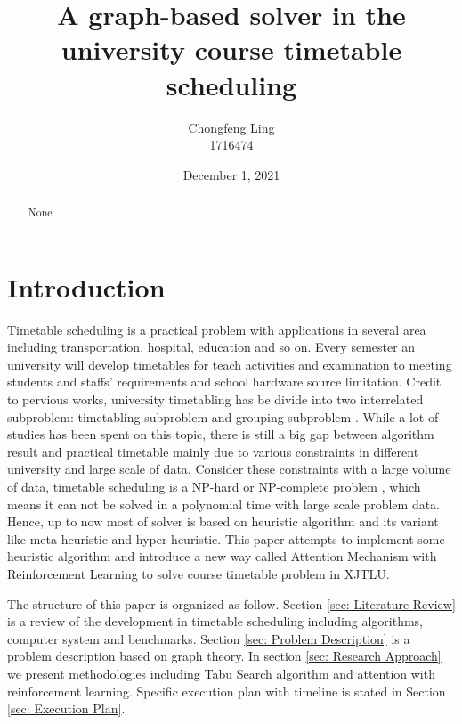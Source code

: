\documentclass{article}
\title{A graph-based solver in the university course timetable scheduling\text}
\author{Chongfeng Ling\\1716474}
\date{December 1, 2021}
\begin{document}
\maketitle

\begin{abstract}
	\begin{center}
		None
	\end{center}
\end{abstract}


\newpage
\tableofcontents
\newpage
\section{Introduction}

Timetable scheduling is a practical problem with applications in several area including transportation, hospital, education and so on. Every semester an university will develop timetables for teach activities and examination to meeting students and staffs' requirements and school hardware source limitation. Credit to pervious works, university timetabling has be divide into two interrelated subproblem: timetabling subproblem and grouping subproblem \citep{(werra1989)tabu}. While a lot of studies has been spent on this topic, there is still a big gap between algorithm result and practical timetable \citep{(mccollum2006)perspective} mainly due to various constraints in different university and large scale of data. Consider these constraints with a large volume of data, timetable scheduling is a NP-hard or NP-complete problem \citep{(even1975)complexity}, which means it can not be solved in a polynomial time with large scale problem data. Hence, up to now most of solver is based on heuristic algorithm and its variant like meta-heuristic and hyper-heuristic. This paper attempts to implement some heuristic algorithm and introduce a new way called Attention Mechanism with Reinforcement Learning to solve course timetable problem in XJTLU.

The structure of this paper is organized as follow. Section \ref{sec: Literature Review} is a review of the development in timetable scheduling including algorithms, computer system and benchmarks. Section \ref{sec: Problem Description} is a problem description based on graph theory. In section \ref{sec: Research Approach} we present methodologies  including Tabu Search algorithm and attention with reinforcement learning. Specific execution plan with timeline is stated in Section \ref{sec: Execution Plan}.
\end{document}
